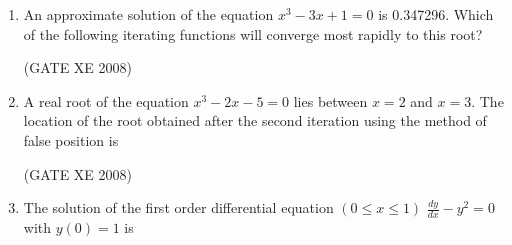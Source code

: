 \documentclass[12pt]{article}
\begin{document}
\begin{enumerate}
\begin{enumerate}
\end{enumerate}

(GATE XE 2008)
\item  An approximate solution of the equation $x^3 - 3x+1=0$ is 0.347296. Which of the following iterating functions will converge most rapidly to this root?

\begin{enumerate}
\end{enumerate}

(GATE XE 2008)
\item  A real root of the equation $x^3 -2x-5 =0$ lies between $x=2$ and $x = 3$. The location of the root obtained after the second iteration using the method of false position is

\begin{enumerate}
\end{enumerate}

(GATE XE 2008)
\item The solution of the first order differential equation $(0\leq x\leq1)$\newline
$\frac{dy}{dx} - y^2 =0$ with $y(0)=1$ is

\begin{enumerate}
\end{enumerate}


\end{enumerate}
\end{document}
